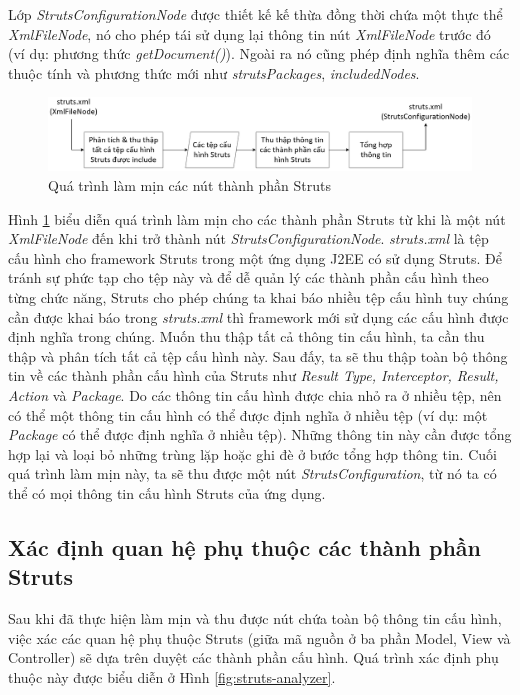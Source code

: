 \documentclass[12pt]{report}
\begin{document}
Lớp \textit{StrutsConfigurationNode} được thiết kế kế thừa đồng thời chứa một thực thể \textit{XmlFileNode}, nó cho phép tái sử dụng lại thông tin nút \textit{XmlFileNode} trước đó (ví dụ: phương thức \textit{getDocument()}). Ngoài ra nó cũng phép định nghĩa thêm các thuộc tính và phương thức mới như \textit{strutsPackages}, \textit{includedNodes}.

\begin{figure}[h]
	\centering
	\includegraphics[scale=0.5]{lam-min-process}
	\caption{Quá trình làm mịn các nút thành phần Struts}
	\label{fig:lam-min-process}
\end{figure}

Hình \ref{fig:lam-min-process} biểu diễn quá trình làm mịn cho các thành phần Struts từ khi là một nút \textit{XmlFileNode} đến khi trở thành nút \textit{StrutsConfigurationNode}. \textit{struts.xml} là tệp cấu hình cho framework Struts trong một ứng dụng J2EE có sử dụng Struts. Để tránh sự phức tạp cho tệp này và để dễ quản lý các thành phần cấu hình theo từng chức năng, Struts cho phép chúng ta khai báo nhiều tệp cấu hình tuy chúng cần được khai báo trong \textit{struts.xml} thì framework mới sử dụng các cấu hình được định nghĩa trong chúng. Muốn thu thập tất cả thông tin cấu hình, ta cần thu thập và phân tích tất cả tệp cấu hình này. Sau đấy, ta sẽ thu thập toàn bộ thông tin về các thành phần cấu hình của Struts như \textit{Result Type, Interceptor, Result, Action} và \textit{Package}. Do các thông tin cấu hình được chia nhỏ ra ở nhiều tệp, nên có thể một thông tin cấu hình có thể được định nghĩa ở nhiều tệp (ví dụ: một \textit{Package} có thể được định nghĩa ở nhiều tệp). Những thông tin này cần được tổng hợp lại và loại bỏ những trùng lặp hoặc ghi đè ở bước tổng hợp thông tin. Cuối quá trình làm mịn này, ta sẽ thu được một nút \textit{StrutsConfiguration}, từ nó ta có thể có mọi thông tin cấu hình Struts của ứng dụng.

\subsection{Xác định quan hệ phụ thuộc các thành phần Struts}
Sau khi đã thực hiện làm mịn và thu được nút chứa toàn bộ thông tin cấu hình, việc xác các quan hệ phụ thuộc Struts (giữa mã nguồn ở ba phần Model, View và Controller) sẽ dựa trên duyệt các thành phần cấu hình. Quá trình xác định phụ thuộc này được biểu diễn ở Hình \ref{fig:struts-analyzer}.
\end{document}
